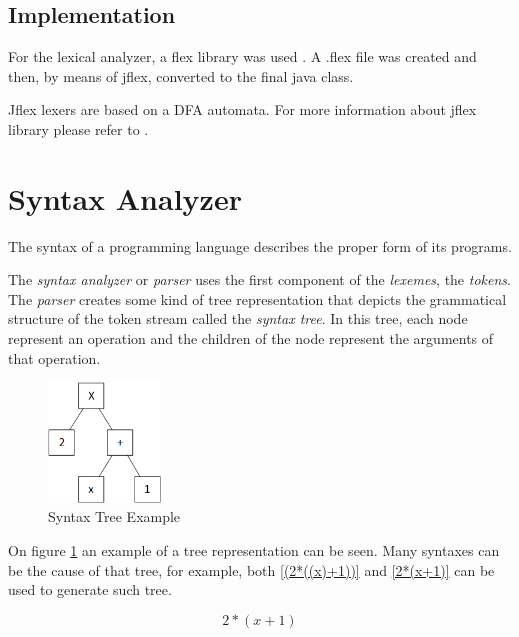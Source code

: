 \documentclass[conference]{IEEEtran}
\begin{document}
\subsection{Implementation}

For the lexical analyzer, a flex library was used \cite{JFLEX}. A .flex file was created and then, by means of jflex, converted to the final java class.

Jflex lexers are based on a DFA automata. For more information about jflex library please refer to \cite{JFLEX_MANUAL}. 

\section{Syntax Analyzer} \label{sub_syntax_analyzer}

The syntax of a programming language describes the proper form of its programs.

The \textit{syntax analyzer} or \textit{parser} uses the first component of the \textit{lexemes}, the \textit{tokens}. The \textit{parser} creates some kind of tree representation that depicts the grammatical structure of the token stream called the \textit{syntax tree}. In this tree, each node represent an operation and the children of the node represent the arguments of that operation. 

\begin{figure}[H]
	\centering
	\includegraphics[width=3cm]{images/syntax_tree.png}
	\caption{Syntax Tree Example}
	\label{fig_syntax_tree_example}
\end{figure}

On figure \ref{fig_syntax_tree_example} an example of a tree representation can be seen. Many syntaxes can be the cause of that tree, for example, both \ref{(2*((x)+1))} and \ref{2*(x+1)} can be used to generate such tree.

\begin{equation}
2*(x+1)
\label{2*(x+1)}
\end{equation}
\end{document}
